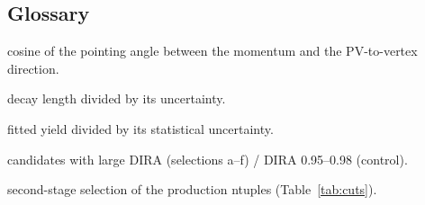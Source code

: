 \subsection*{Glossary}
\begin{description}\setlength{\itemsep}{0pt}
\item[DIRA] cosine of the pointing angle between the \Dzero{} momentum and the PV-to-vertex direction.
\item[\Ls] decay length divided by its uncertainty.
\item[$z$] fitted yield divided by its statistical uncertainty.
\item[pointing / non-pointing] candidates with large DIRA (selections a--f) / DIRA 0.95--0.98 (control).
\item[skim] second-stage selection of the production ntuples (Table~\ref{tab:cuts}).
\end{description}
